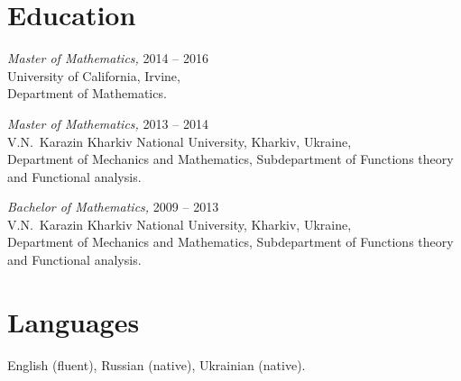 \documentclass[margin, 10pt]{res} %
\begin{document}
\begin{resume}
\section{Education}
{\sl Master of Mathematics,} \hfill 2014 -- 2016\\
University of California, Irvine, \\
Department of Mathematics.

{\sl Master of Mathematics,} \hfill  2013 -- 2014\\
 V.N.\ Karazin Kharkiv National University, Kharkiv, Ukraine,\\
Department of Mechanics and Mathematics, Subdepartment 
of Functions theory and Functional analysis. 

{\sl Bachelor of Mathematics,} \hfill 2009 -- 2013\\
V.N.\ Karazin Kharkiv National University, Kharkiv, Ukraine,\\
Department of Mechanics and Mathematics, Subdepartment 
of Functions theory and Functional analysis.

\section{Languages}
English (fluent), Russian (native), Ukrainian (native).

\end{resume}
\end{document}
